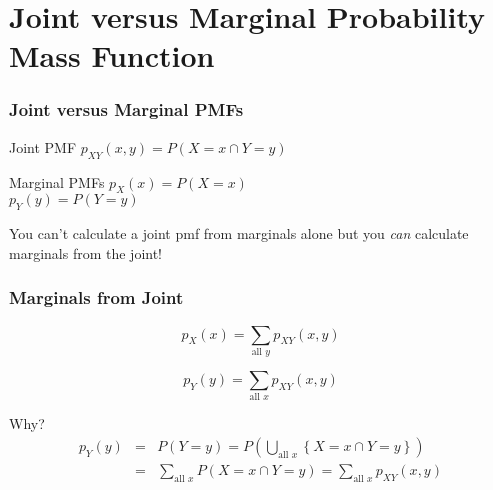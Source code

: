 \section{Joint versus Marginal Probability Mass Function}
\begin{frame}
\frametitle{Joint versus Marginal PMFs}

\begin{block}{Joint PMF}
 $p_{XY}(x,y) = P(X=x \cap Y=y)$
\end{block}



\begin{block}{Marginal PMFs}
$p_X(x) = P(X=x)$\\ $p_Y(y) = P(Y=y)$
\end{block}



\vspace{1em}

\alert{You can't calculate a joint pmf from marginals alone but you \emph{can} calculate marginals from the joint!}

\end{frame}
\begin{frame}
\frametitle{Marginals from Joint}

	$$\boxed{p_X(x) = \sum_{\mbox{all } y} p_{XY}(x,y)}$$
	
	$$\boxed{p_Y(y) = \sum_{\mbox{all } x} p_{XY}(x,y)}$$


\begin{block}{Why?}
	\begin{eqnarray*}
	p_Y(y) &=& P(Y=y) = P\left( \bigcup_{\mbox{all } x}\left\{ X=x \cap Y=y \right\}  \right)\\
		&=& \sum_{\mbox{all } x} P(X=x \cap Y=y) = \sum_{\mbox{all } x} p_{XY}(x,y)
	\end{eqnarray*}
\end{block}
\end{frame}
